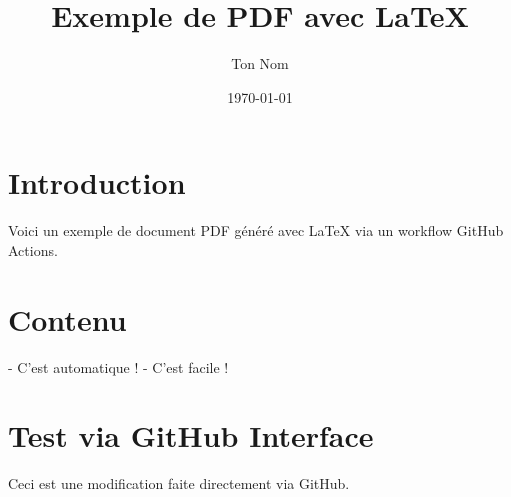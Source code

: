 \documentclass{article}
\title{Exemple de PDF avec LaTeX}
\author{Ton Nom}
\date{\today}
\begin{document}
\maketitle

\section{Introduction}
Voici un exemple de document PDF généré avec LaTeX via un workflow GitHub Actions.

\section{Contenu}
- C'est automatique !
- C'est facile !

\section{Test via GitHub Interface}
Ceci est une modification faite directement via GitHub.
\end{document}
